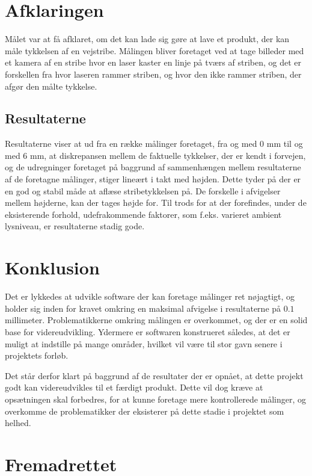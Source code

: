 \section{Afklaringen}
Målet var at få afklaret, om det kan lade sig gøre at lave et produkt, der kan måle tykkelsen af en vejstribe.
Målingen bliver foretaget ved at tage billeder med et kamera af en stribe hvor en laser kaster en linje på tværs af striben, og det er forskellen fra hvor laseren rammer striben, og hvor den ikke rammer striben, der afgør den målte tykkelse.

\subsection{Resultaterne}
Resultaterne viser at ud fra en række målinger foretaget, fra og med 0 mm til og med 6 mm, at diskrepansen mellem de faktuelle tykkelser, der er kendt i forvejen, og de udregninger foretaget på baggrund af sammenhængen mellem resultaterne af de foretagne målinger, stiger lineært i takt med højden. Dette tyder på der er en god og stabil måde at aflæse stribetykkelsen på. De forskelle i afvigelser mellem højderne, kan der tages højde for. Til trods for at der forefindes, under de eksisterende forhold, udefrakommende faktorer, som f.eks. varieret ambient lysniveau, er resultaterne stadig gode.

\section{Konklusion}
Det er lykkedes at udvikle software der kan foretage målinger ret nøjagtigt, og holder sig inden for kravet omkring en maksimal afvigelse i resultaterne på $0.1$ millimeter. Problematikkerne omkring målingen er overkommet, og der er en solid base for videreudvikling. Ydermere er softwaren konstrueret således, at det er muligt at indstille på mange områder, hvilket vil være til stor gavn senere i projektets forløb.

Det står derfor klart på baggrund af de resultater der er opnået, at dette projekt godt kan videreudvikles til et færdigt produkt. Dette vil dog kræve at opsætningen skal forbedres, for at kunne foretage mere kontrollerede målinger, og overkomme de problematikker der eksisterer på dette stadie i projektet som helhed.

\newpage

\section{Fremadrettet}


